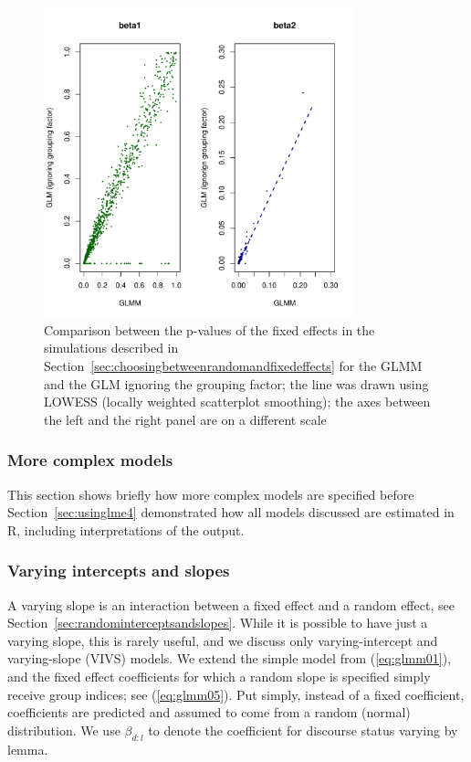 \documentclass[a4paper,12pt]{article}
\begin{document}
\begin{figure}[!htpb]
  \centering
  \includegraphics[width=0.8\textwidth]{graphics/pcomparison}
  \caption{Comparison between the p-values of the fixed effects in the simulations described in Section~\ref{sec:choosingbetweenrandomandfixedeffects} for the GLMM and the GLM ignoring the grouping factor; the line was drawn using LOWESS (locally weighted scatterplot smoothing); the axes between the left and the right panel are on a different scale}
  \label{fig:pcomparison}
\end{figure}

\subsubsection{More complex models}
\label{sec:morecomplexmodels}

This section shows briefly how more complex models are specified before Section~\ref{sec:usinglme4} demonstrated how all models discussed are estimated in R, including interpretations of the output.

\subsubsection{Varying intercepts and slopes}
\label{sec:varyinginterceptsandslopes}

A varying slope is an interaction between a fixed effect and a random effect, see Section~\ref{sec:randominterceptsandslopes}.
While it is possible to have just a varying slope, this is rarely useful, and we discuss only varying-intercept and varying-slope (VIVS) models.
We extend the simple model from (\ref{eq:glmm01}), and the fixed effect coefficients for which a random slope is specified simply receive group indices; see (\ref{eq:glmm05}).
Put simply, instead of a fixed coefficient, coefficients are predicted and assumed to come from a random (normal) distribution.
We use $\beta_{d:l}$ to denote the coefficient for discourse status varying by lemma.
\end{document}
